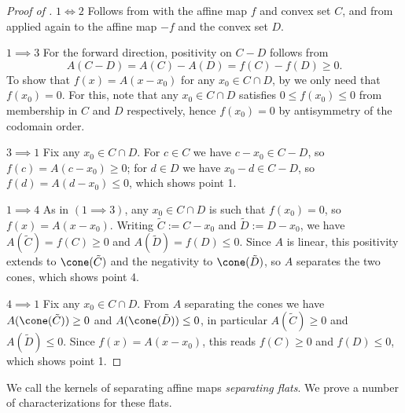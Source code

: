 \documentclass{article}
\theoremstyle{plain}
\theoremstyle{definition}
\theoremstyle{remark}
\begin{document}
\begin{proof}[\hypertarget{loc:oriented_separation_of_convex_sets.proof}{}Proof of ]

$1 \iff 2$ Follows from  with the affine map $f$ and convex set $C$, and from  applied again to the affine map $-f$ and the convex set $D$.

$1 \implies 3$
For the forward direction, positivity on $C-D$ follows from
\begin{equation*}
A(C - D) = A(C) - A(D) = f(C) - f(D) \geq 0.
\end{equation*}
To show that $f(x) = A(x-x_0)$ for any $x_0 \in C \cap D$, by  we only need that $f(x_0)=0$. For this, note that any $x_0 \in C \cap D$ satisfies $0 \le f(x_0) \le 0$ from membership in $C$ and $D$ respectively, hence $f(x_0) = 0$ by antisymmetry of the codomain order.

$3  \implies 1$
Fix any $x_0 \in C \cap D$. For $c \in C$ we have $c - x_0 \in C - D$, so $f(c) = A(c - x_0) \ge 0$; for $d \in D$ we have $x_0 - d \in C - D$, so $f(d) = A(d - x_0) \le 0$, which shows point 1.

$1 \implies 4$
As in $(1 \implies 3)$, any $x_0 \in C \cap D$ is such that $f(x_0) = 0$, so $f(x) = A(x - x_0)$. Writing $\tilde{C} := C - x_0$ and $\tilde{D} := D - x_0$, we have $A(\tilde{C}) = f(C) \ge 0$ and $A(\tilde{D}) = f(D) \le 0$. Since $A$ is linear, this positivity extends to $\cone(\tilde{C})$ and the negativity to $\cone(\tilde{D})$, so $A$ separates the two cones, which shows point 4.

$4 \implies 1$
Fix any $x_0 \in C \cap D$. From $A$ separating the cones we have $A(\cone(\tilde{C})) \ge 0$ and $A(\cone(\tilde{D})) \le 0$, in particular $A(\tilde{C}) \ge 0$ and $A(\tilde{D}) \le 0$. Since $f(x) = A(x - x_0)$, this reads $f(C) \ge 0$ and $f(D) \le 0$, which shows point 1.
\end{proof}
We call the kernels of separating affine maps \emph{separating flats}. We prove a number of characterizations for these flats.
\end{document}
